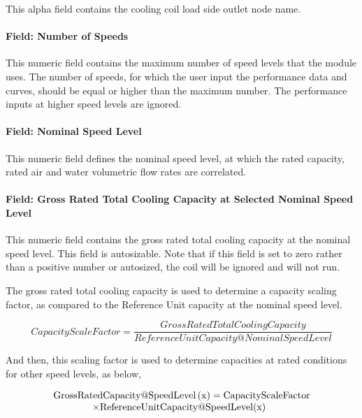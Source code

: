This alpha field contains the cooling coil load side outlet node name.

\paragraph{Field: Number of Speeds}\label{field-number-of-speeds-4}

This numeric field contains the maximum number of speed levels that the module uses. The number of speeds, for which the user input the performance data and curves, should be equal or higher than the maximum number. The performance inputs at higher speed levels are ignored.

\paragraph{Field: Nominal Speed Level}\label{field-nominal-speed-level-2}

This numeric field defines the nominal speed level, at which the rated capacity, rated air and water volumetric flow rates are correlated.

\paragraph{Field: Gross Rated Total Cooling Capacity at Selected Nominal Speed Level}\label{field-gross-rated-total-cooling-capacity-at-selected-nominal-speed-level-1}

This numeric field contains the gross rated total cooling capacity at the nominal speed level. This field is autosizable. Note that if this field is set to zero rather than a positive number or autosized, the coil will be ignored and will not run.

The gross rated total cooling capacity is used to determine a capacity scaling factor, as compared to the Reference Unit capacity at the nominal speed level.

\begin{equation}
CapacityScaleFactor = \frac{{GrossRatedTotalCoolingCapacity}}{{ReferenceUnitCapacity@NominalSpeedLevel}}
\end{equation}

And then, this scaling factor is used to determine capacities at rated conditions for other speed levels, as below,

\begin{equation}
  \begin{array}{l}
    \rm{GrossRatedCapacity} @ \rm{SpeedLevel} \left( x \right) = \rm{CapacityScaleFactor} \\
    \quad \quad \quad \quad \times \rm{ReferenceUnitCapacity} @ \rm{SpeedLevel}( x )
  \end{array}
\end{equation}


